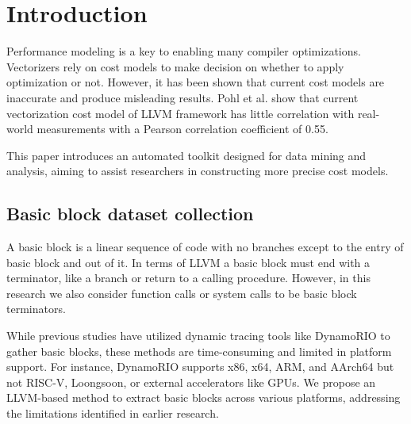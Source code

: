 \section{Introduction}
Performance modeling is a key to enabling many compiler optimizations. Vectorizers rely on cost models to 
make decision on whether to apply optimization or not. However, it has been shown that current cost models
are inaccurate and produce misleading results. Pohl et al. \cite{pohlPortableCostModeling2019} show that
current vectorization cost model of LLVM framework has little correlation with real-world measurements 
with a Pearson correlation coefficient of 0.55.

This paper introduces an automated toolkit designed for data mining and analysis, aiming to assist 
researchers in constructing more precise cost models.

\subsection{Basic block dataset collection}

A basic block is a linear sequence of code with no branches except to the entry of basic block and out 
of it. In terms of LLVM a basic block must end with a terminator, like a branch or return to a calling 
procedure. However, in this research we also consider function calls or system calls to be basic block 
terminators.

While previous studies have utilized dynamic tracing tools like DynamoRIO \cite{chenBHiveBenchmarkSuite2019} 
to gather basic blocks, these methods are time-consuming and limited in platform support. For instance, 
DynamoRIO supports x86, x64, ARM, and AArch64 \cite{brueningInfrastructureAdaptiveDynamic2003} but not 
RISC-V, Loongsoon, or external accelerators like GPUs. We propose an LLVM-based method to extract basic 
blocks across various platforms, addressing the limitations identified in earlier research.

